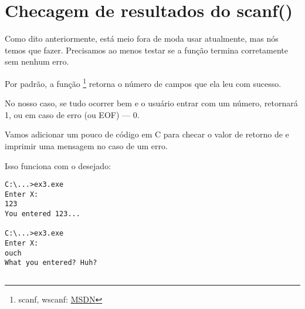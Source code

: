 \section{Checagem de resultados do scanf()}

Como dito anteriormente, está meio fora de moda usar \scanf atualmente, mas nós temos que fazer.
Precisamos ao menos testar se a função \scanf termina corretamente sem nenhum erro.



Por padrão, a função \scanf\footnote{scanf, wscanf: \href{http://go.yurichev.com/17255}{MSDN}} retorna o número de campos que ela leu com sucesso.

No nosso caso, se tudo ocorrer bem e o usuário entrar com um número, \scanf retornará 1, ou em caso de erro (ou \ac{EOF}) --- 0.

Vamos adicionar um pouco de código em C para checar o valor de retorno de \scanf e imprimir uma mensagem no caso de um erro.

Isso funciona com o desejado:

\begin{lstlisting}
C:\...>ex3.exe
Enter X:
123
You entered 123...

C:\...>ex3.exe
Enter X:
ouch
What you entered? Huh?
\end{lstlisting}






\subsection{\Exercise}

\PTBRph{}

